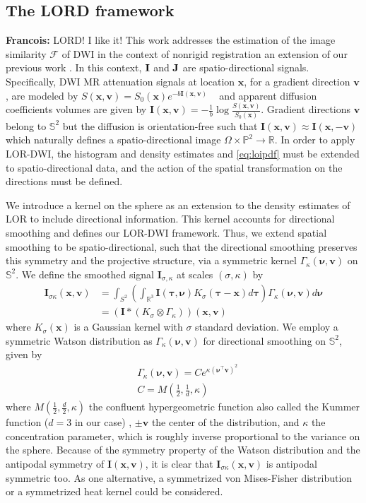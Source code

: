 \documentclass[twocolumn]{svjour3}
\newcommand{\francois}[1]{{\color{red}\textbf{Francois: }#1}}
\newcommand{\francois}[1]{{}}
\begin{document}
\subsection{The LORD framework}
\francois{LORD! I like it!}
This work addresses the estimation of the image similarity $\mathcal F$ of DWI in the
context of nonrigid registration an extension of our previous work
\cite{jensen2015locally}.
In this context, ${\bf I}$ and ${\bf J}$ are spatio-directional signals. Specifically, DWI MR
attenuation signals at location $\bm x$, for a gradient direction $\bm v$, are modeled by
$S(\bm x,\bm v) = S_0(\bm x) e^{-b\bm I(\bm x,\bm v)}$ \ \cite{tao2006method} and apparent
diffusion coefficients volumes are given by
$\bm I(\bm x,\bm v)=-\frac{1}{b}\log\frac{S(\bm x,\bm v)}{S_0(\bm x)}$. Gradient
directions $\bm v$ belong to $\mathbb S^2$ but the diffusion is orientation-free such that
$\bm I(\bm x,\bm v)\approx \bm I(\bm x,-\bm v)$ which naturally defines a
spatio-directional image $\Omega\times \mathbb P^2 \to \mathbb R$.  In order to apply
LOR-DWI, the histogram and density estimates  and \cref{eq:loipdf} must be
extended to spatio-directional data, and the action of the spatial transformation on the
directions must be defined.

We introduce a kernel on the sphere as an extension to the density estimates of LOR to
include directional information. This kernel accounts for directional smoothing and
defines our LOR-DWI framework.  Thus, we extend spatial smoothing to be
spatio-directional, such that the directional smoothing preserves this symmetry and the
projective structure, via a symmetric kernel $\Gamma_\kappa(\bm \nu,\bm v)$ on
$\mathbb{S}^2$. We define the smoothed signal $\bm I_{\sigma,\kappa}$ at scales
$(\sigma,\kappa)$ by
\begin{align}
  \bm I_{\sigma\kappa}(\bm x,\bm v)&=\label{eq:vecfieldsmooth}
      \int_{S^2} \left( \int_{\mathbb R^3} \bm I(\bm \tau,\bm \nu)K_\sigma(\bm \tau-\bm x)d\bm \tau\right) 
     \Gamma_{\kappa}(\bm \nu, \bm v) d\bm \nu\nonumber\\&=(\bm I*(K_{\sigma}\otimes \Gamma_{\kappa}))(\bm x,\bm v)
\end{align}
where $K_\sigma(\bm x)$ is a Gaussian kernel with $\sigma$ standard deviation.  We employ
a symmetric Watson distribution \cite{jupp1989unified} as $\Gamma_{\kappa}(\bm \nu,\bm v)$
for directional smoothing on $\mathbb S^2$, given by
\begin{align}
&\Gamma_\kappa(\bm \nu,\bm v)=Ce^{\kappa({\bm \nu}^\top \bm v)^2}\\ &C=M(\frac{1}{2},\frac{1}{d},\kappa)
\end{align}
where $M(\frac12,\frac{d}2,\kappa)$ the confluent hypergeometric function also called the
Kummer function ($d=3$ in our case) \cite{AbramowitzStegun1974}, $\pm\bm v$ the center of
the distribution, and $\kappa$ the concentration parameter, which is roughly inverse
proportional to the variance on the sphere. Because of the symmetry property of the Watson
distribution and the antipodal symmetry of $\bm I(\bm x,\bm v)$, it is clear that
$\bm I_{\sigma\kappa}(\bm x,\bm v)$ is antipodal symmetric too. As one alternative, a
symmetrized von Mises-Fisher \cite{jupp1989unified} distribution or a symmetrized heat
kernel could be considered.
\end{document}
